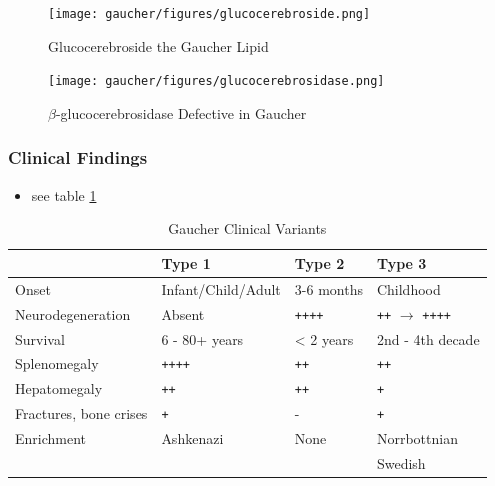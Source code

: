 \documentclass[12pt]{scrartcl}
\begin{document}
\begin{figure}[htbp]
\centering
\texttt{[image: gaucher/figures/glucocerebroside.png]}
\caption{\label{fig:org47f7e94}Glucocerebroside the Gaucher Lipid}
\end{figure}

\begin{figure}[htbp]
\centering
\texttt{[image: gaucher/figures/glucocerebrosidase.png]}
\caption{\label{fig:org3d50a67}\(\beta\)-glucocerebrosidase Defective in Gaucher}
\end{figure}

\subsubsection{Clinical Findings}
\label{sec:org3209cbe}
\begin{itemize}
\item see table \ref{tab:org7584278}
\end{itemize}

\begin{table}[htbp]
\caption{\label{tab:org7584278}Gaucher Clinical Variants}
\centering
\begin{tabular}{llll}
 & Type 1 & Type 2 & Type 3\\
\hline
Onset & Infant/Child/Adult & 3-6 months & Childhood\\
Neurodegeneration & Absent & \texttt{++++} & \texttt{++} \(\to\) \texttt{++++}\\
Survival & 6 - 80+ years & < 2 years & 2nd - 4th decade\\
Splenomegaly & \texttt{++++} & \texttt{++} & \texttt{++}\\
Hepatomegaly & \texttt{++} & \texttt{++} & \texttt{+}\\
Fractures, bone crises & \texttt{+} & - & \texttt{+}\\
Enrichment & Ashkenazi & None & Norrbottnian\\
 &  &  & Swedish\\
\end{tabular}
\end{table}
\end{document}
